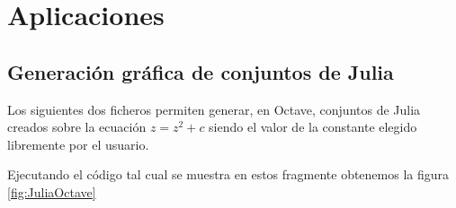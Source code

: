 



\section{Aplicaciones}
\subsection{Generación gráfica de conjuntos de Julia}
Los siguientes dos ficheros permiten generar, en Octave, conjuntos de Julia creados sobre la ecuación $z=z^2+c$ siendo el valor de la constante elegido libremente por el usuario.




Ejecutando el código tal cual se muestra en estos fragmente obtenemos la figura \ref{fig:JuliaOctave}

